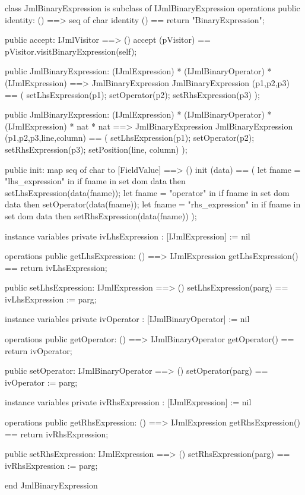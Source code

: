 \begin{vdm_al}
class JmlBinaryExpression is subclass of IJmlBinaryExpression
operations
  public identity: () ==> seq of char
  identity () == return "BinaryExpression";

  public accept: IJmlVisitor ==> ()
  accept (pVisitor) == pVisitor.visitBinaryExpression(self);

  public JmlBinaryExpression:
    (IJmlExpression) *
    (IJmlBinaryOperator) *
    (IJmlExpression) ==> JmlBinaryExpression
  JmlBinaryExpression (p1,p2,p3) == 
    ( setLhsExpression(p1);
      setOperator(p2);
      setRhsExpression(p3) );

  public JmlBinaryExpression:
    (IJmlExpression) *
    (IJmlBinaryOperator) *
    (IJmlExpression) *
    nat *
    nat ==> JmlBinaryExpression
  JmlBinaryExpression (p1,p2,p3,line,column) == 
    ( setLhsExpression(p1);
      setOperator(p2);
      setRhsExpression(p3);
      setPosition(line, column) );

  public init: map seq of char to [FieldValue] ==> ()
  init (data) ==
    ( let fname = "lhs_expression" in
        if fname in set dom data
        then setLhsExpression(data(fname));
      let fname = "operator" in
        if fname in set dom data
        then setOperator(data(fname));
      let fname = "rhs_expression" in
        if fname in set dom data
        then setRhsExpression(data(fname)) );

instance variables
  private ivLhsExpression : [IJmlExpression] := nil

operations
  public getLhsExpression: () ==> IJmlExpression
  getLhsExpression() == return ivLhsExpression;

  public setLhsExpression: IJmlExpression ==> ()
  setLhsExpression(parg) == ivLhsExpression := parg;

instance variables
  private ivOperator : [IJmlBinaryOperator] := nil

operations
  public getOperator: () ==> IJmlBinaryOperator
  getOperator() == return ivOperator;

  public setOperator: IJmlBinaryOperator ==> ()
  setOperator(parg) == ivOperator := parg;

instance variables
  private ivRhsExpression : [IJmlExpression] := nil

operations
  public getRhsExpression: () ==> IJmlExpression
  getRhsExpression() == return ivRhsExpression;

  public setRhsExpression: IJmlExpression ==> ()
  setRhsExpression(parg) == ivRhsExpression := parg;

end JmlBinaryExpression
\end{vdm_al}

